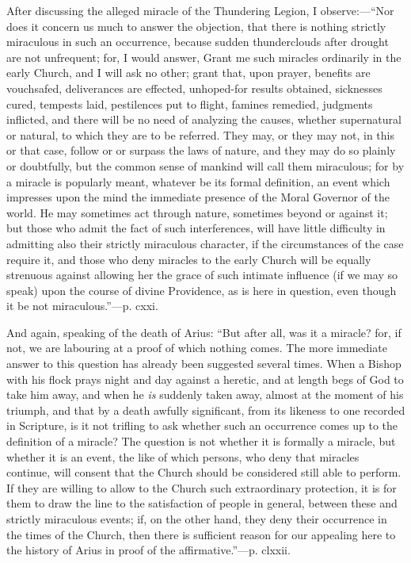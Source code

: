 After discussing the alleged miracle of the Thundering Legion, I
observe:—``Nor does it concern us much to answer the objection,
that there is nothing strictly miraculous in such an occurrence, because
sudden thunderclouds after drought are not unfrequent; for, I would
answer, Grant me such miracles ordinarily in the early Church, and I
will ask no other; grant that, upon prayer, benefits are vouchsafed,
deliverances are effected, unhoped-for results obtained, sicknesses
cured, tempests laid, pestilences put to flight, famines remedied,
judgments inflicted, and there will be no need of analyzing the causes,
whether supernatural or natural, to which they are to be referred. They
may, or they may not, in this or that case, follow or or surpass
the laws of nature, and they may do so plainly or doubtfully, but the
common sense of mankind will call them miraculous; for by a miracle is
popularly meant, whatever be its formal definition, an event which
impresses upon the mind the immediate presence of the Moral Governor of
the world. He may sometimes act through nature, sometimes beyond or
against it; but those who admit the fact of such interferences, will
have little difficulty in admitting also their strictly miraculous
character, if the circumstances of the case require it, and those who
deny miracles to the early Church will be equally strenuous against
allowing her the grace of such intimate influence (if we may so speak)
upon the course of divine Providence, as is here in question, even
though it be not miraculous.''—p. cxxi.

And again, speaking of the death of Arius: ``But after all, was
it a miracle? for, if not, we are labouring at a proof of which nothing
comes. The more immediate answer to this question has already been
suggested several times. When a Bishop with his flock prays night and
day against a heretic, and at length begs of God to take him away, and
when he \emph{is} suddenly taken away, almost at the moment of his triumph, and
that by a death awfully significant, from its likeness to one recorded
in Scripture, is it not trifling to ask whether such an occurrence comes
up to the definition of a miracle? The question is not whether it is
formally a miracle, but whether it is an event, the like of which
persons, who deny that miracles continue, will consent that the Church
should be considered still able to perform. If they are willing to allow
to the Church such extraordinary protection, it is for them to draw the
line to the satisfaction of people in general, between these and
strictly miraculous events; if, on the other hand, they deny their
occurrence in the times of the Church, then there is sufficient reason
for our appealing here to the history of Arius in proof of the
affirmative.''—p. clxxii.

